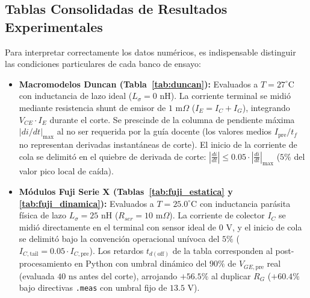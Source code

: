 \documentclass[11pt,a4paper]{article}
\begin{document}
\FloatBarrier
\begin{landscape}
\pagestyle{landscapestyle}

\section{Tablas Consolidadas de Resultados Experimentales}

\begin{cuadronota}
  Para interpretar correctamente los datos numéricos, es indispensable distinguir las condiciones particulares de cada banco de ensayo:
  \begin{itemize}[leftmargin=*, noitemsep, topsep=1pt]
    \item \textbf{Macromodelos Duncan (Tabla~\ref{tab:duncan}):} Evaluados a $T = 27^\circ\text{C}$ con inductancia de lazo ideal ($L_\sigma = 0\text{ nH}$). La corriente terminal se midió mediante resistencia shunt de emisor de $1\text{ m}\Omega$ ($I_E = I_C + I_G$), integrando $V_{CE} \cdot I_E$ durante el corte. Se prescinde de la columna de pendiente máxima $|di/dt|_{\max}$ al no ser requerida por la guía docente (los valores medios $I_{\text{pre}}/t_f$ no representan derivadas instantáneas de corte). El inicio de la corriente de cola se delimitó en el quiebre de derivada de corte: $\left|\frac{di}{dt}\right| \le 0.05 \cdot \left|\frac{di}{dt}\right|_{\max}$ ($5\%$ del valor pico local de caída).
    \item \textbf{Módulos Fuji Serie X (Tablas~\ref{tab:fuji_estatica} y \ref{tab:fuji_dinamica}):} Evaluados a $T = 25.0^\circ\text{C}$ con inductancia parásita física de lazo $L_\sigma = 25\text{ nH}$ ($R_{ser} = 10\text{ m}\Omega$). La corriente de colector $I_C$ se midió directamente en el terminal con sensor ideal de $0\text{ V}$, y el inicio de cola se delimitó bajo la convención operacional unívoca del $5\%$ ($I_{C,\text{tail}} = 0.05 \cdot I_{C,\text{pre}}$). Los retardos $t_{d(\text{off})}$ de la tabla corresponden al post-procesamiento en Python con umbral dinámico del $90\%$ de $V_{GE,\text{pre}}$ real (evaluada $40\text{ ns}$ antes del corte), arrojando $+56.5\%$ al duplicar $R_G$ ($+60.4\%$ bajo directivas \texttt{.meas} con umbral fijo de $13.5\text{ V}$).
  \end{itemize}
\end{cuadronota}

\vspace{0.25cm}


\end{landscape}
\end{document}
